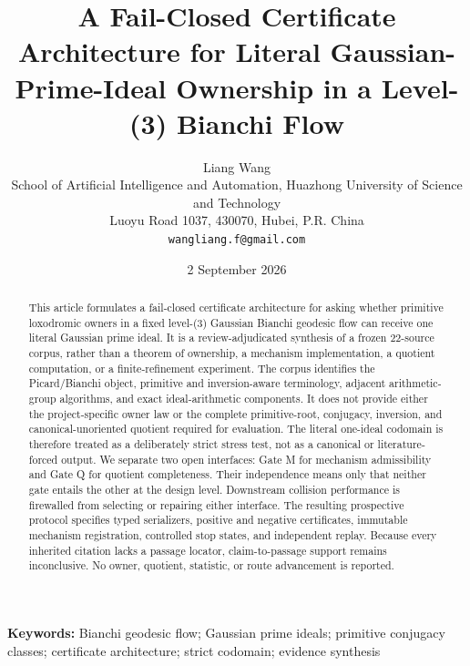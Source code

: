 \documentclass[11pt,a4paper]{article}
\title{A Fail-Closed Certificate Architecture for Literal Gaussian-Prime-Ideal Ownership in a Level-(3) Bianchi Flow}
\author{Liang Wang\\
\small School of Artificial Intelligence and Automation, Huazhong University of Science and Technology\\
\small Luoyu Road 1037, 430070, Hubei, P.R. China\\
\small \texttt{wangliang.f@gmail.com}}
\date{2 September 2026}
\begin{document}
\maketitle

\begin{abstract}
This article formulates a fail-closed certificate architecture for asking whether primitive loxodromic owners in a fixed level-(3) Gaussian Bianchi geodesic flow can receive one literal Gaussian prime ideal. It is a review-adjudicated synthesis of a frozen 22-source corpus, rather than a theorem of ownership, a mechanism implementation, a quotient computation, or a finite-refinement experiment. The corpus identifies the Picard/Bianchi object, primitive and inversion-aware terminology, adjacent arithmetic-group algorithms, and exact ideal-arithmetic components. It does not provide either the project-specific owner law or the complete primitive-root, conjugacy, inversion, and canonical-unoriented quotient required for evaluation. The literal one-ideal codomain is therefore treated as a deliberately strict stress test, not as a canonical or literature-forced output. We separate two open interfaces: Gate M for mechanism admissibility and Gate Q for quotient completeness. Their independence means only that neither gate entails the other at the design level. Downstream collision performance is firewalled from selecting or repairing either interface. The resulting prospective protocol specifies typed serializers, positive and negative certificates, immutable mechanism registration, controlled stop states, and independent replay. Because every inherited citation lacks a passage locator, claim-to-passage support remains inconclusive. No owner, quotient, statistic, or route advancement is reported.
\end{abstract}

\noindent\textbf{Keywords:} Bianchi geodesic flow; Gaussian prime ideals; primitive conjugacy classes; certificate architecture; strict codomain; evidence synthesis
\end{document}
